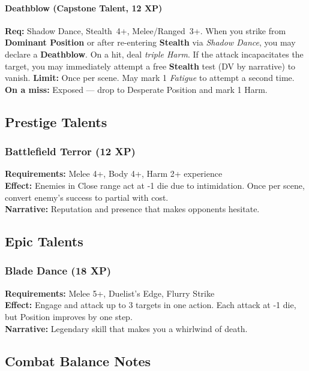 \paragraph{Deathblow (Capstone Talent, 12 XP)}  
\textbf{Req:} Shadow Dance, Stealth~4+, Melee/Ranged~3+.  
When you strike from \textbf{Dominant Position} or after re-entering \textbf{Stealth} via \emph{Shadow Dance}, you may declare a \textbf{Deathblow}.  
On a hit, deal \emph{triple Harm}. If the attack incapacitates the target, you may immediately attempt a free \textbf{Stealth} test (DV by narrative) to vanish.  
\textbf{Limit:} Once per scene. May mark 1 \emph{Fatigue} to attempt a second time.  
\textbf{On a miss:} Exposed --- drop to Desperate Position and mark 1 Harm.  

\subsection{Prestige Talents}

\subsubsection{Battlefield Terror (12 XP)}
\textbf{Requirements:} Melee 4+, Body 4+, Harm 2+ experience \\
\textbf{Effect:} Enemies in Close range act at -1 die due to intimidation. Once per scene, convert enemy's success to partial with cost. \\
\textbf{Narrative:} Reputation and presence that makes opponents hesitate.


\subsection{Epic Talents}

\subsubsection{Blade Dance (18 XP)}
\textbf{Requirements:} Melee 5+, Duelist's Edge, Flurry Strike \\
\textbf{Effect:} Engage and attack up to 3 targets in one action. Each attack at -1 die, but Position improves by one step. \\
\textbf{Narrative:} Legendary skill that makes you a whirlwind of death.


\subsection{Combat Balance Notes}

